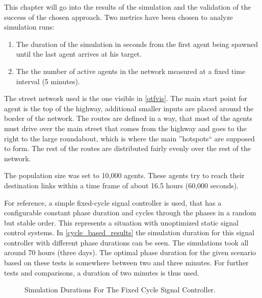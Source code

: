 This chapter will go into the results of the simulation and the validation of the success of the chosen approach. Two metrics have been chosen to analyze simulation runs:

\begin{enumerate}
	\item The duration of the simulation in seconds from the first agent being spawned until the last agent arrives at his target.
	\item The the number of active agents in the network measured at a fixed time interval (5 minutes).
\end{enumerate}

The street network used is the one visible in \autoref{otfvis}. The main start point for agent is the top of the highway, additional smaller inputs are placed around the border of the network. The routes are defined in a way, that most of the agents must drive over the main street that comes from the highway and goes to the right to the large roundabout, which is where the main ''hotspots`` are supposed to form. The rest of the routes are distributed fairly evenly over the rest of the network.

The population size was set to 10,000 agents. These agents try to reach their destination links within a time frame of about 16.5 hours (60,000 seconds).

For reference, a simple fixed-cycle signal controller is used, that has a configurable constant phase duration and cycles through the phases in a random but stable order. This represents a situation with unoptimized static signal control systems. In \autoref{cycle_based_results} the simulation duration for this signal controller with different phase durations can be seen. The simulations took all around 70 hours (three days). The optimal phase duration for the given scenario based on these tests is somewhere between two and three minutes. For further tests and comparisons, a duration of two minutes is thus used.

\begin{figure}
	\centering	
	\caption{Simulation Durations For The Fixed Cycle Signal Controller.}
	\label{cycle_based_results}
\end{figure}


